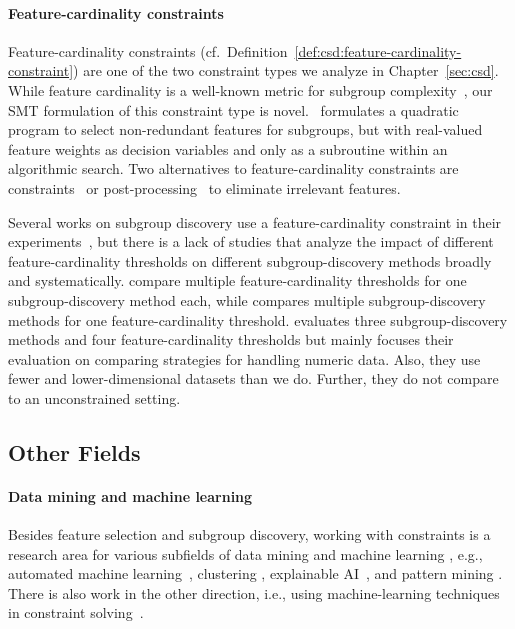 \paragraph{Feature-cardinality constraints}

Feature-cardinality constraints (cf.~Definition~\ref{def:csd:feature-cardinality-constraint}) are one of the two constraint types we analyze in Chapter~\ref{sec:csd}.
While feature cardinality is a well-known metric for subgroup complexity~\cite{helal2016subgroup, herrera2011overview, ventura2018subgroup}, our SMT formulation of this constraint type is novel.
\cite{li2015efficient}~formulates a quadratic program to select non-redundant features for subgroups, but with real-valued feature weights as decision variables and only as a subroutine within an algorithmic search.
Two alternatives to feature-cardinality constraints are constraints~\cite{lavrac2006relevancy} or post-processing~\cite{friedman1999bump} to eliminate irrelevant features.

Several works on subgroup discovery use a feature-cardinality constraint in their experiments~\cite{arzamasov2022pedagogical, lavrac2006relevancy, leeuwen2012diverse, leeuwen2013discovering, mampaey2012efficient}, but there is a lack of studies that analyze the impact of different feature-cardinality thresholds on different subgroup-discovery methods broadly and systematically.
\cite{friedman1999bump, lemmerich2010fast, proencca2022robust} compare multiple feature-cardinality thresholds for one subgroup-discovery method each, while \cite{helal2016subgroup} compares multiple subgroup-discovery methods for one feature-cardinality threshold.
\cite{meeng2021real} evaluates three subgroup-discovery methods and four feature-cardinality thresholds but mainly focuses their evaluation on comparing strategies for handling numeric data.
Also, they use fewer and lower-dimensional datasets than we do.
Further, they do not compare to an unconstrained setting.

\subsection{Other Fields}
\label{sec:related-work:constraints:other-fields}

\paragraph{Data mining and machine learning}

Besides feature selection and subgroup discovery, working with constraints is a research area for various subfields of data mining and machine learning \cite{grossi2017survey}, e.g., automated machine learning~\cite{neutatz2023automl}, clustering \cite{dao2013declarative, dao2024review}, explainable AI~\cite{deutch2019constraints, gorji2022sufficient, mothilal2020explaining, shrotri2022constraint}, and pattern mining \cite{ng1998exploratory, silva2016constrained}.
There is also work in the other direction, i.e., using machine-learning techniques in constraint solving~\cite{popescu2022overview}.

